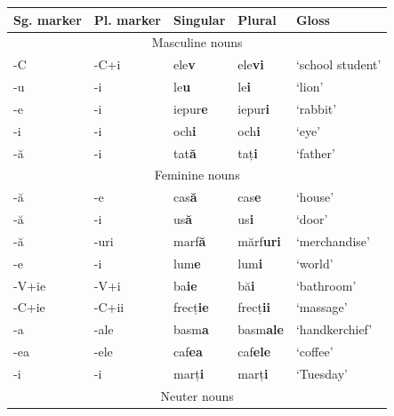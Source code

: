 \begin{table}[!htbp]
  \centering
  \begin{tabular}{lllll}
    \lsptoprule
    Sg. marker & Pl. marker & Singular           & Plural             & Gloss            \\
        \midrule
    \multicolumn{5}{c}{Masculine nouns}                                                  \\
    \midrule
    -C         & -C+i       & ele\textbf{v}      & ele\textbf{vi}     & `school student' \\
    -u         & -i         & le\textbf{u}       & le\textbf{i}       & `lion'           \\
    -e         & -i         & iepur\textbf{e}    & iepur\textbf{i}    & `rabbit'         \\
    -i         & -i         & och\textbf{i}      & och\textbf{i}      & `eye'            \\
    -ă         & -i         & tat\textbf{ă}      & taț\textbf{i}      & `father'         \\
    \midrule
    \multicolumn{5}{c}{Feminine nouns}                                                   \\
    \midrule
    -ă         & -e         & cas\textbf{ă}      & cas\textbf{e}      & `house'          \\
    -ă         & -i         & us\textbf{ă}       & us\textbf{i}       & `door'           \\
    -ă         & -uri       & marf\textbf{ă}     & mărf\textbf{uri}   & `merchandise'    \\
    -e         & -i         & lum\textbf{e}      & lum\textbf{i}      & `world'          \\
    -V+ie      & -V+i       & ba\textbf{ie}      & bă\textbf{i}       & `bathroom'       \\
    -C+ie      & -C+ii      & frecț\textbf{ie}   & frecț\textbf{ii}   & `massage'        \\
    -a         & -ale       & basm\textbf{a}     & basm\textbf{ale}   & `handkerchief'   \\
    -ea        & -ele       & caf\textbf{ea}     & caf\textbf{ele}    & `coffee'         \\
    -i         & -i         & marț\textbf{i}     & marț\textbf{i}     & `Tuesday'        \\
    \midrule
    \multicolumn{5}{c}{Neuter nouns}                                                     \\

\end{tabular}
\end{table}
